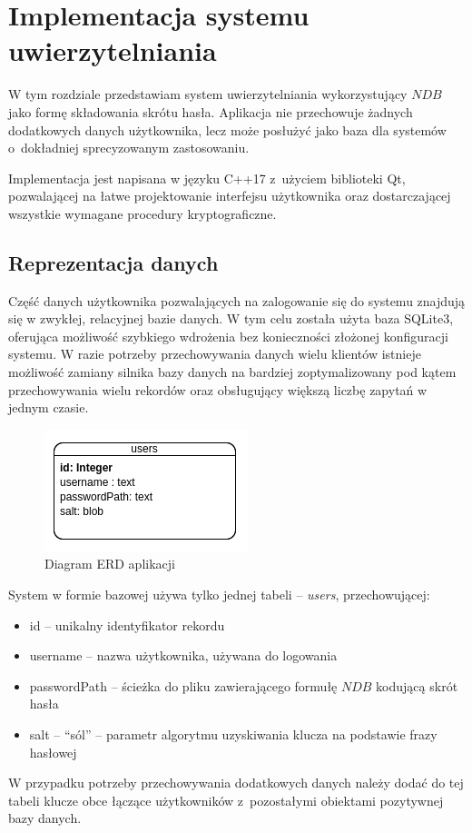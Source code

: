 
\chapter{Implementacja systemu uwierzytelniania}
\label{chp:implementation}
W tym rozdziale przedstawiam system uwierzytelniania wykorzystujący $NDB$ jako formę składowania skrótu hasła. 
Aplikacja nie przechowuje żadnych dodatkowych danych użytkownika, lecz może posłużyć jako baza dla systemów o~dokładniej sprecyzowanym zastosowaniu.

Implementacja jest napisana w języku C++17 z~użyciem biblioteki Qt, pozwalającej na łatwe projektowanie interfejsu użytkownika oraz dostarczającej
wszystkie wymagane procedury kryptograficzne.
\section{Reprezentacja danych}
Część danych użytkownika pozwalających na zalogowanie się do systemu znajdują się w zwykłej, relacyjnej bazie danych.
W tym celu została użyta baza SQLite3, oferująca możliwość szybkiego wdrożenia bez konieczności złożonej konfiguracji systemu.
W razie potrzeby przechowywania danych wielu klientów istnieje możliwość zamiany silnika bazy danych na bardziej 
zoptymalizowany pod kątem przechowywania wielu rekordów oraz obsługujący większą liczbę zapytań w jednym czasie.


\begin{figure}[h]
    \includegraphics{img/diagrams/erd.png}
    \centering
    \caption{Diagram ERD aplikacji}
    \label{img:erd}
\end{figure}

System w formie bazowej używa tylko jednej tabeli -- \textit{users}, przechowującej:
\begin{itemize}
    \item id -- unikalny identyfikator rekordu
    \item username -- nazwa użytkownika, używana do logowania
    \item passwordPath -- ścieżka do pliku zawierającego formułę $NDB$ kodującą skrót hasła
    \item salt -- \enquote{sól} -- parametr algorytmu uzyskiwania klucza na podstawie frazy hasłowej
\end{itemize}
W przypadku potrzeby przechowywania dodatkowych danych należy dodać do tej tabeli klucze obce łączące użytkowników z~pozostałymi obiektami pozytywnej bazy danych.

